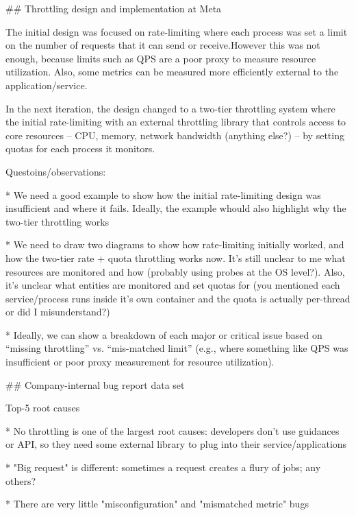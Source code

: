 ## Throttling design and implementation at Meta

The initial design was focused on rate-limiting where each process was set a limit on the number of requests that it can send or receive.However this was not enough, because limits such as QPS are a poor proxy to measure resource utilization. Also, some metrics can be measured more efficiently external to the application/service.

In the next iteration, the design changed to a two-tier throttling system where the initial rate-limiting with an external throttling library that controls access to core resources -- CPU, memory, network bandwidth (anything else?) -- by setting quotas for each process it monitors.

Questoins/observations:

* We need a good example to show how the initial rate-limiting design was insufficient and where it fails. Ideally, the example whould also highlight why the two-tier throttling works

* We need to draw two diagrams to show how rate-limiting initially worked, and how the two-tier rate + quota throttling works now. It's still unclear to me what resources are monitored and how (probably using probes at the OS level?). Also, it's unclear what entities are monitored and set quotas for (you mentioned each service/process runs inside it's own container and the quota is actually per-thread or did I misunderstand?)

* Ideally, we can show a breakdown of each major or critical issue based on ``missing throttling'' vs. ``mis-matched limit'' (e.g., where something like QPS was insufficient or poor proxy measurement for resource utilization).

## Company-internal bug report data set


Top-5 root causes

* No throttling is one of the largest root causes: developers don't use guidances or API, so they need some external library to plug into their service/applications

* "Big request" is different: sometimes a request creates a flury of jobs; any others?

* There are very little "misconfiguration" and "mismatched metric" bugs
